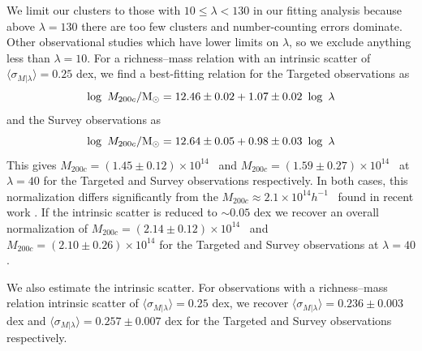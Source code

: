 \documentclass[fleqn,usenatbib]{mnras}
\begin{document}
We limit our clusters to those with $10 \leq \lambda < 130$ in our fitting analysis because above $\lambda=130$ there are too few clusters and number-counting errors dominate. Other observational studies  which have lower limits on $\lambda$, so we exclude anything less than $\lambda=10$. For a richness--mass relation with an intrinsic scatter of $\langle \sigma_{M|\lambda} \rangle = 0.25$ dex, we find a best-fitting relation for the Targeted observations as
\begin{equation}
	\log\ M_{200c}/\hbox{$\mathrm{M}_\odot$} = 12.46\pm0.02 + 1.07\pm0.02\ \log\ \lambda
\end{equation} 
and the Survey observations as
\begin{equation}
	\log\ M_{200c}/\hbox{$\mathrm{M}_\odot$} = 12.64\pm0.05 + 0.98\pm0.03\ \log\ \lambda
\end{equation} 
This gives $M_{200c} = (1.45\pm0.12)\times10^{14}$ \Msol\ and $M_{200c} = (1.59\pm0.27)\times10^{14}$ \Msol\ at $\lambda=40$ for the Targeted and Survey observations respectively. In both cases, this normalization differs significantly from the $M_{200c} \approx 2.1\times10^{14} h^{-1}$ \Msol\ found in recent work \cite{Li2016, Simet2016}. If the intrinsic scatter is reduced to $\sim 0.05$ dex we recover an overall normalization of $M_{200c} = (2.14\pm0.12)\times10^{14}$ \Msol\ and $M_{200c} = (2.10\pm0.26)\times10^{14}$ for the Targeted and Survey observations at $\lambda=40$.

We also estimate the intrinsic scatter. For observations with a richness--mass relation intrinsic scatter of $\langle \sigma_{M|\lambda} \rangle = 0.25$ dex, we recover $\langle \sigma_{M|\lambda} \rangle = 0.236\pm0.003$ dex and $\langle \sigma_{M|\lambda} \rangle = 0.257\pm0.007$ dex for the Targeted and Survey observations respectively. 

\end{document}
